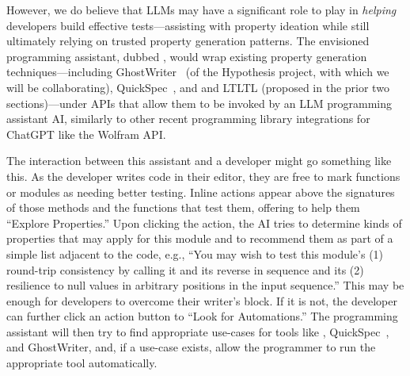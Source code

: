 However, we do believe that LLMs may have a significant role to play
in {\em helping} developers build effective tests---assisting with
property ideation while still ultimately relying on trusted
property generation patterns.
The envisioned programming assistant, dubbed {\em \GhostChat}, would wrap existing property generation
techniques---including GhostWriter~\cite{ref:ghostwriter} (of the Hypothesis
project, with which we will be collaborating), QuickSpec~\cite{ref:claessen2010quickspec},
and \Mica{} and LTLTL (proposed in the prior two sections)---under APIs that allow them to be invoked by
an LLM programming assistant AI, similarly to other recent programming library
integrations for ChatGPT like the Wolfram API.

The interaction between this assistant and a developer might go
something like this. As the
developer writes code in their editor, they are free to mark functions or
modules as needing better testing.
Inline actions appear
above the signatures of those methods and the
functions that test them, offering to help them ``Explore Properties.''
Upon clicking the action, the AI tries to determine
kinds of properties that may apply for this module
and to recommend them as part of a simple list adjacent to the
code, e.g., ``You may wish to test this module's (1) round-trip consistency by
calling it and its reverse in sequence and its (2) resilience to null values in
arbitrary positions in the input sequence.'' This may be enough for developers
to overcome their writer's block. If it is not, the developer can further click
an action button to ``Look for Automations.'' The programming assistant will
then try to find appropriate use-cases for tools like {\Mica},
QuickSpec~\cite{ref:claessen2010quickspec}, and GhostWriter, and, if a use-case
exists, allow the programmer to run the appropriate tool automatically.

